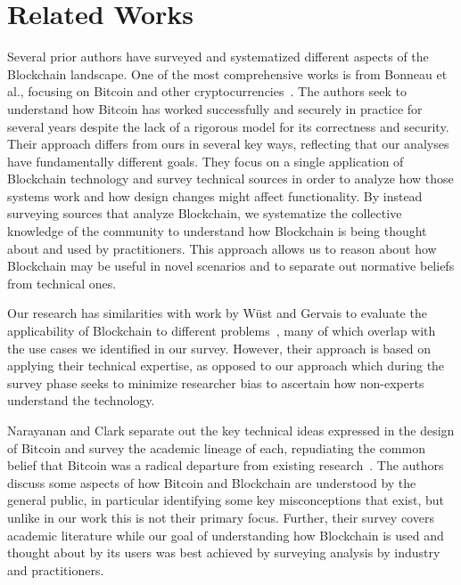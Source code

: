 
\section{Related Works}
\label{sec:related-works}
Several prior authors have surveyed and systematized different aspects of the Blockchain landscape.
One of the most comprehensive works is from Bonneau et al., focusing on Bitcoin and other cryptocurrencies~\cite{BMC+15}. The authors seek to understand how Bitcoin has worked successfully and securely in practice for several years despite the lack of a rigorous model for its correctness and security. %
Their approach differs from ours in several key ways, reflecting that our analyses have fundamentally different goals. They focus on a single application of Blockchain technology and survey technical sources in order to analyze how those systems work and how design changes might affect functionality. By instead surveying sources that analyze Blockchain, we systematize the collective knowledge of the community to understand how Blockchain is being thought about and used by practitioners. This approach allows us to reason about how Blockchain may be useful in novel scenarios and to separate out normative beliefs from technical ones. 

Our research has similarities with work by W{\"u}st and Gervais to evaluate the applicability of Blockchain to different problems~\cite{Wust17}, many of which overlap with the use cases we identified in our survey. However, their approach is based on applying their technical expertise, as opposed to our approach which during the survey phase seeks to minimize researcher bias to ascertain how non-experts understand the technology.

Narayanan and Clark separate out the key technical ideas expressed in the design of Bitcoin and survey the academic lineage of each, repudiating the common belief that Bitcoin was a radical departure from existing research~\cite{Narayanan17}. The authors discuss some aspects of how Bitcoin and Blockchain are understood by the general public, in particular identifying some key misconceptions that exist, but unlike in our work this is not their primary focus. Further, their survey covers academic literature while our goal of understanding how Blockchain is used and thought about by its users was best achieved by surveying analysis by industry and practitioners.

